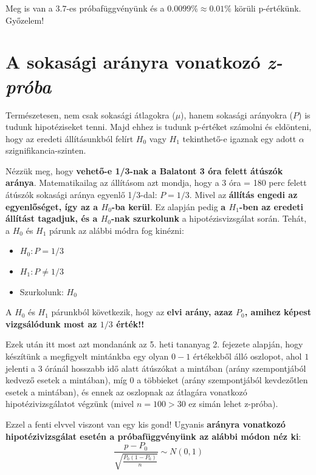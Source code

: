 \documentclass[
]{book}
\providecommand{\tightlist}{%
  \setlength{\itemsep}{0pt}\setlength{\parskip}{0pt}}
\begin{document}
Meg is van a \(3.7\)-es próbafüggvényünk és a \(0.0099\% \approx 0.01\%\) körüli p-értékünk. Győzelem!

\section{\texorpdfstring{A sokasági arányra vonatkozó \emph{z-próba}}{A sokasági arányra vonatkozó z-próba}}\label{a-sokasuxe1gi-aruxe1nyra-vonatkozuxf3-z-pruxf3ba}

Természetesen, nem csak sokasági átlagokra (\(\mu\)), hanem sokasági arányokra (\(P\)) is tudunk hipotéziseket tenni. Majd ehhez is tudunk p-értéket számolni és eldönteni, hogy az eredeti állításunkból felírt \(H_0\) vagy \(H_1\) tekinthető-e igaznak egy adott \(\alpha\) szignifikancia-szinten.

Nézzük meg, hogy \textbf{vehető-e 1/3-nak a Balatont 3 óra felett átúszók aránya}. Matematikailag az állításom azt mondja, hogy a 3 óra = 180 perc felett átúszók sokasági aránya egyenlő 1/3-dal: \(P = 1/3\). Mivel az \textbf{állítás engedi az egyenlőséget, így az a \(H_0\)-ba kerül}. Ez alapján pedig \textbf{a \(H_1\)-ben az eredeti állítást tagadjuk, és a \(H_0\)-nak szurkolunk} a hipotézisvizsgálat során. Tehát, a \(H_0\) és \(H_1\) párunk az alábbi módra fog kinézni:

\begin{itemize}
\tightlist
\item
  \(H_0:P=1/3\)
\item
  \(H_1:P\neq1/3\)
\item
  Szurkolunk: \(H_0\)
\end{itemize}

A \(H_0\) és \(H_1\) párunkból következik, hogy az \textbf{elvi arány, azaz \(P_0\), amihez képest vizgsálódunk most az \(1/3\) érték!!}

Ezek után itt most azt mondanánk az 5. heti tananyag 2. fejezete alapján, hogy készítünk a megfigyelt mintánkba egy olyan \(0-1\) értékekből álló oszlopot, ahol \(1\) jelenti a 3 óránál hosszabb idő alatt átúszókat a mintában (arány szempontjából kedvező esetek a mintában), míg \(0\) a többieket (arány szempontjából kevdezőtlen esetek a mintában), és ennek az oszlopnak az átlagára vonatkozó hipotézivizsgálatot végzünk (mivel \(n=100 > 30\) ez simán lehet z-próba).

Ezzel a fenti elvvel viszont van egy kis gond! Ugyanis \textbf{arányra vonatkozó hipotézivizsgálat esetén a próbafüggvényünk az alábbi módon néz ki}: \[\frac{p-P_0}{\sqrt{\frac{P_0(1-P_0)}{n}}} \sim N(0,1)\]
\end{document}
